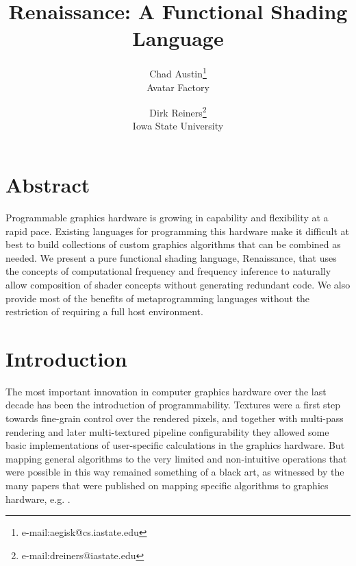 \documentclass{acmsiggraph}               %
\title{Renaissance: A Functional Shading Language}
\author{Chad Austin\thanks{e-mail:aegisk@cs.iastate.edu}\\ Avatar Factory %
\and Dirk Reiners\thanks{e-mail:dreiners@iastate.edu}\\ Iowa State University}
\begin{document}
\section{Abstract}

Programmable graphics hardware is growing in capability and
flexibility at a rapid pace.  Existing languages for programming this
hardware make it difficult at best to build collections of custom
graphics algorithms that can be combined as needed.  We present a pure
functional shading language, Renaissance, that uses the concepts of
computational frequency and frequency inference to naturally allow
composition of shader concepts without generating redundant code.  We
also provide most of the benefits of metaprogramming languages without
the restriction of requiring a full host environment.

\section{Introduction}

The most important innovation in computer graphics hardware over the last 
decade has been the introduction of programmability. Textures were a first
step  towards fine-grain control over the rendered pixels, and together with
multi-pass  rendering and later multi-textured pipeline configurability they
allowed some  basic implementations of user-specific calculations in the
graphics hardware. But mapping general algorithms to the very limited
and non-intuitive  operations that were possible in this way remained
something of a black art, as  witnessed by the many papers that were
published on mapping specific algorithms to graphics hardware, e.g. 
\cite{heidrich01Shading,kautztowards}. 
\end{document}
